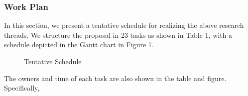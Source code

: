 \documentclass[12pt]{article}
\begin{document}
\vspace{-3mm}
\subsubsection{Work Plan}
\label{subsec:schedule}
\vspace{-2mm} 

In this section, we present a tentative schedule for realizing the
above research threads. We structure the proposal in 23 tasks as shown
in Table 1, with a schedule depicted in the Gantt chart in Figure 1.



\begin{figure}[htb!]
  \begin{center}
   \epsfysize=5in
 \label{fig:ag1}
\vspace{-5mm}
  \end{center}
\end{figure}


\begin{figure}[htb!]
  \begin{center}
   \epsfysize=4in
\caption{Tentative Schedule}
 \label{fig:ag}
\vspace{-3mm}
  \end{center}
\end{figure}


The owners and time of each task are also shown in the table and
figure. Specifically,
\end{document}
